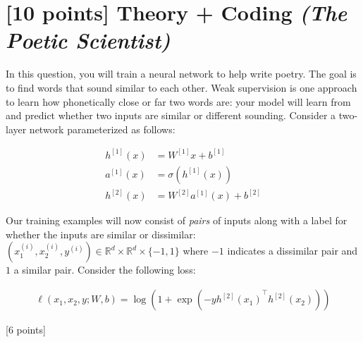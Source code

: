 \documentclass{article}
\begin{document}
\clearpage 

\section{[10 points] Theory + Coding  \it{(The Poetic Scientist)}}

In this question, you will train a neural network to help write poetry. The goal is to find words that sound similar to each other. Weak supervision is one approach to learn how phonetically close or far two words are: your model will learn from and predict whether two inputs are similar or different sounding. Consider a two-layer network parameterized as follows:

\begin{align}
    h^{[1]}(x) &= W^{[1]}x + b^{[1]}\\
    a^{[1]}(x) &= \sigma(h^{[1]}(x))\\
    h^{[2]}(x) &= W^{[2]}a^{[1]}(x) + b^{[2]}
\end{align}

Our training examples will now consist of \textit{pairs} of inputs along with a label for whether the inputs are similar or dissimilar: $(x^{(i)}_1, x^{(i)}_2, y^{(i)}) \in \mathbb{R}^{d} \times \mathbb{R}^d \times \{-1, 1\}$ where $-1$ indicates a dissimilar pair and $1$ a similar pair. Consider the following loss:

\begin{align}
    \ell(x_1, x_2, y; W, b) = \log\left(1 + \exp(-y{h^{[2]}(x_1)}^\top h^{[2]}(x_2))\right)
\end{align}

\noindent {} [6 points]
\end{document}
